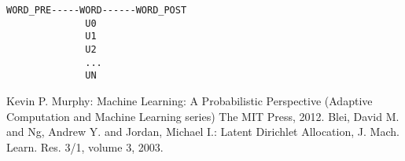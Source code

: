 \documentclass[uplatex]{jsarticle}
\begin{document}
\begin{lstlisting}
WORD_PRE-----WORD------WORD_POST
              U0
              U1
              U2
              ...
              UN
\end{lstlisting}

\begin{thebibliography}{99}
   Kevin P. Murphy: Machine Learning: A Probabilistic Perspective (Adaptive Computation and Machine Learning series) The MIT Press, 2012.
   Blei, David M. and Ng, Andrew Y. and Jordan, Michael I.: Latent Dirichlet Allocation,
J. Mach. Learn. Res. 3/1, volume 3, 2003.
\end{thebibliography}
\end{document}
